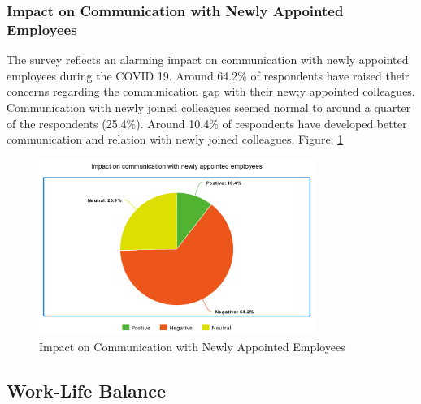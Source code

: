 \documentclass[11pt]{article}
\begin{document}
\subsubsection{Impact on Communication with Newly Appointed Employees}
The survey reflects an alarming impact on communication with newly appointed employees during the COVID 19. Around 64.2\% of respondents have raised their concerns regarding the communication gap with their new;y appointed colleagues. Communication with newly joined colleagues seemed normal to around a quarter of the respondents (25.4\%). Around 10.4\% of respondents have developed better communication and relation with newly joined colleagues. Figure: \ref{Newly Appointed Employees}
\begin{figure}[!ht]
	\centering
	\includegraphics[width=0.8\textwidth]{Images/Collaboration/New Employees.png}
	\caption{Impact on Communication with Newly Appointed Employees}
	\centering
	\label{Newly Appointed Employees}
\end{figure}

\subsection {Work-Life Balance}
\end{document}
